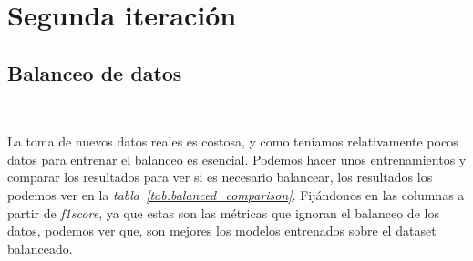 \section{Segunda iteración}

\subsection{Balanceo de datos}\ \label{sec:i2-balance}

La toma de nuevos datos reales es costosa, y como teníamos relativamente pocos datos para entrenar el balanceo es esencial. Podemos hacer unos entrenamientos y comparar los resultados para ver si es necesario balancear, los resultados los podemos ver en la \textit{tabla\ \ref{tab:balanced_comparison}}. Fijándonos en las columnas a partir de \textit{f1score}, ya que estas son las métricas que ignoran el balanceo de los datos, podemos ver que, son mejores los modelos entrenados sobre el \gls{dataset} balanceado.

